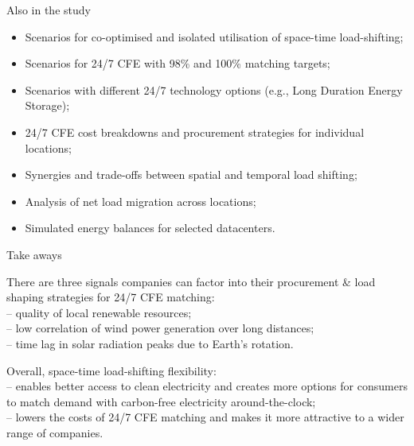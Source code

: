 \begin{frame}{Also in the study}
  
      \begin{itemize}
      \item Scenarios for \alert{co-optimised} and \alert{isolated} utilisation of space-time load-shifting;
      \item Scenarios for 24/7 CFE with \alert{98\% and 100\%} matching targets;
      \item Scenarios with different \alert{24/7 technology options} (e.g., Long Duration Energy Storage);
      \item 24/7 CFE \alert{cost breakdowns} and \alert{procurement strategies} for individual locations;
      \item \alert{Synergies} and \alert{trade-offs} between spatial and temporal load shifting;
      \item Analysis of \alert{net load migration} across locations;
      \item Simulated \alert{energy balances} for selected datacenters.
      \end{itemize}

\end{frame}

\begin{frame}{Take aways}

There are \alert{three signals} companies can factor into their procurement \& load shaping strategies for 24/7 CFE matching: \\
\vspace{0.1cm}
  -- quality of local renewable resources;\\
  -- low correlation of wind power generation over long distances;\\
  -- time lag in solar radiation peaks due to Earth's rotation.\\

\vspace{0.5cm}

Overall, space-time load-shifting flexibility: \\
\vspace{0.1cm}
  -- enables \alert{better access to clean electricity} and creates \alert{more options} for consumers to match demand with carbon-free electricity around-the-clock; \\
  -- \alert{lowers the costs} of 24/7 CFE matching and makes it \alert{more attractive} to a wider range of companies.\\

    
\end{frame}


